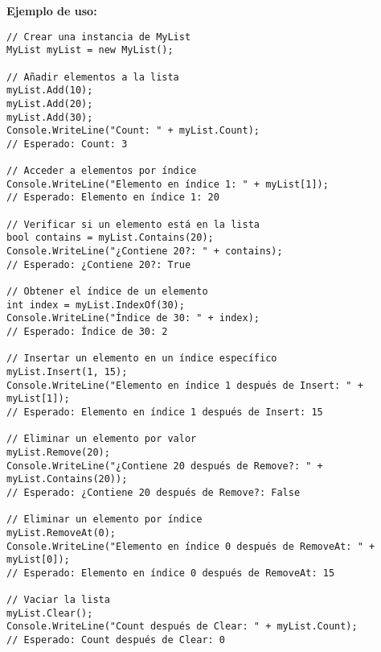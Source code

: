 \textbf{Ejemplo de uso:}
\begin{lstlisting}
// Crear una instancia de MyList
MyList myList = new MyList();

// Añadir elementos a la lista
myList.Add(10);
myList.Add(20);
myList.Add(30);
Console.WriteLine("Count: " + myList.Count);
// Esperado: Count: 3

// Acceder a elementos por índice
Console.WriteLine("Elemento en índice 1: " + myList[1]);
// Esperado: Elemento en índice 1: 20

// Verificar si un elemento está en la lista
bool contains = myList.Contains(20);
Console.WriteLine("¿Contiene 20?: " + contains);
// Esperado: ¿Contiene 20?: True

// Obtener el índice de un elemento
int index = myList.IndexOf(30);
Console.WriteLine("Índice de 30: " + index);
// Esperado: Índice de 30: 2

// Insertar un elemento en un índice específico
myList.Insert(1, 15);
Console.WriteLine("Elemento en índice 1 después de Insert: " + myList[1]);
// Esperado: Elemento en índice 1 después de Insert: 15

// Eliminar un elemento por valor
myList.Remove(20);
Console.WriteLine("¿Contiene 20 después de Remove?: " + myList.Contains(20));
// Esperado: ¿Contiene 20 después de Remove?: False

// Eliminar un elemento por índice
myList.RemoveAt(0);
Console.WriteLine("Elemento en índice 0 después de RemoveAt: " + myList[0]);
// Esperado: Elemento en índice 0 después de RemoveAt: 15

// Vaciar la lista
myList.Clear();
Console.WriteLine("Count después de Clear: " + myList.Count);
// Esperado: Count después de Clear: 0
\end{lstlisting}
